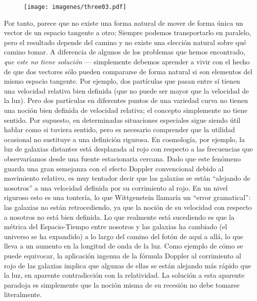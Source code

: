 \documentclass[11pt,b5paper,openany,twoside]{book}
\begin{document}
\begin{figure}[h]
\centering
\texttt{[image: imagenes/three03.pdf]}
\end{figure}

Por tanto, parece que no existe una forma natural de mover de forma única un vector de un espacio tangente a otro; Siempre podemos transportarlo en paralelo, pero el resultado depende del camino y no existe una elección natural sobre qué camino tomar.
A diferencia de algunos de los problemas que hemos encontrado, \textit{que este no tiene solución} --- simplemente debemos aprender a vivir con el hecho de que dos vectores sólo pueden compararse de forma natural si son elementos del mismo espacio tangente.
Por ejemplo, dos partículas que pasan entre sí tienen una velocidad relativa bien definida (que no puede ser mayor que la velocidad de la luz).
Pero dos partículas en diferentes puntos de una variedad curva no tienen una noción bien definida de velocidad relativa; el concepto simplemente no tiene sentido.
Por supuesto, en determinadas situaciones especiales sigue siendo útil hablar como si tuviera sentido, pero es necesario comprender que la utilidad ocasional no sustituye a una definición rigurosa.
En cosmología, por ejemplo, la luz de galaxias distantes está desplazada al rojo con respecto a las frecuencias que observaríamos desde una fuente estacionaria cercana.
Dado que este fenómeno guarda una gran semejanza con el efecto Doppler convencional debido al movimiento relativo, es muy tentador decir que las galaxias se están ``alejando de nosotros'' a una velocidad definida por su corrimiento al rojo.
En un nivel riguroso esto es una tontería, lo que Wittgenstein llamaría un ``error gramatical'': las galaxias no están retrocediendo, ya que la noción de su velocidad con respecto a nosotros no está bien definida.
Lo que realmente está sucediendo es que la métrica del Espacio-Tiempo entre nosotros y las galaxias ha cambiado (el universo se ha expandido) a lo largo del camino del fotón de aquí a allá, lo que lleva a un aumento en la longitud de onda de la luz.
Como ejemplo de cómo se puede equivocar, la aplicación ingenua de la fórmula Doppler al corrimiento al rojo de las galaxias implica que algunas de ellas se están alejando más rápido que la luz, en aparente contradicción con la relatividad.
La solución a esta aparente paradoja es simplemente que la noción misma de su recesión no debe tomarse literalmente.
\end{document}
